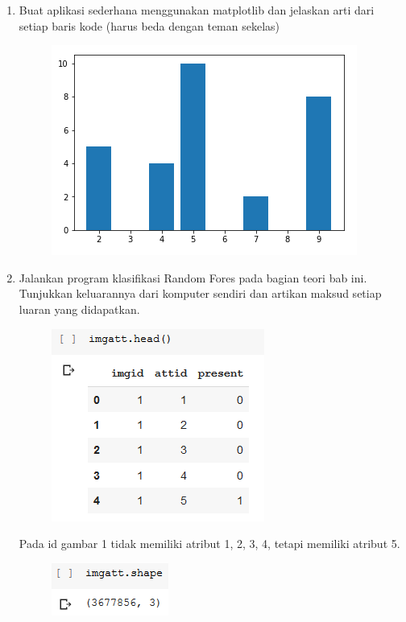 \begin{enumerate}
	\item Buat aplikasi sederhana menggunakan matplotlib dan jelaskan arti dari setiap baris kode (harus beda dengan teman sekelas)
	\hfill\break
	
	\begin{figure}[H]
	\centering
		\includegraphics[width=8 cm]{figures/1174006/chapter3/soalpraktek/3.PNG}
	\end{figure}

	\item Jalankan  program  klasifikasi  Random  Fores  pada  bagian  teori  bab  ini.   Tunjukkan  keluarannya  dari  komputer  sendiri  dan  artikan  maksud  setiap  luaran yang didapatkan.
	\hfill\break
	\begin{figure}[H]
	\centering
		\includegraphics[width=8 cm]{figures/1174006/chapter3/soalpraktek/4-1.PNG}
	\end{figure}

	Pada id gambar 1 tidak memiliki atribut 1, 2, 3, 4, tetapi memiliki atribut 5.

	\hfill\break
	\begin{figure}[H]
	\centering
		\includegraphics[width=8 cm]{figures/1174006/chapter3/soalpraktek/4-2.PNG}
	\end{figure}


\end{enumerate}
